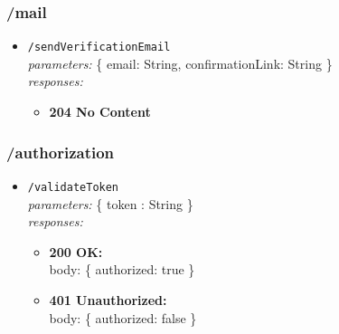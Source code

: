 \subsubsection*{/mail}
\begin{itemize}
    \item \texttt{/sendVerificationEmail} \\
        \textit{parameters:} \{ email: String, confirmationLink: String \} \\
        \textit{responses:}
        \begin{itemize}
            \item \textbf{204 No Content}
        \end{itemize}
\end{itemize}

\subsubsection*{/authorization}
\begin{itemize}
    \item \texttt{/validateToken} \\
        \textit{parameters:} \{ token : String \} \\
        \textit{responses:}
        \begin{itemize}
            \item \textbf{200 OK:} \\
            body: \{ authorized: true \}
            \item \textbf{401 Unauthorized:} \\
            body: \{ authorized: false \}
        \end{itemize}
\end{itemize}

